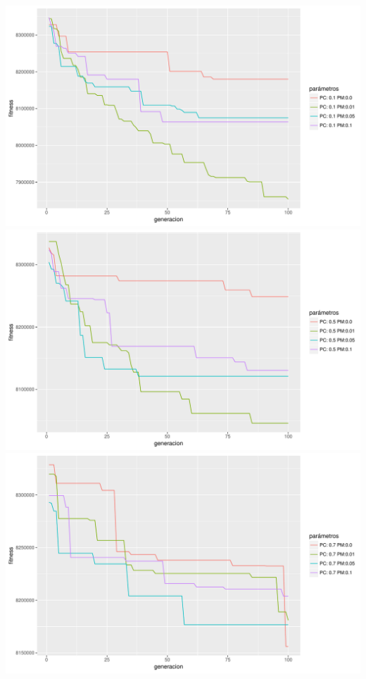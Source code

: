 \documentclass[10pt,a4paper]{article}
\begin{document}
\includegraphics[width = \textwidth]{img/graphics/GAbaldwinPC01.pdf}
\includegraphics[width = \textwidth]{img/graphics/GAbaldwinPC05.pdf}
\includegraphics[width = \textwidth]{img/graphics/GAbaldwinPC07.pdf}
\end{document}
